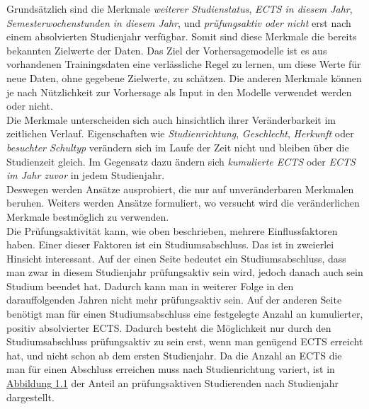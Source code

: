 Grunds\"atzlich sind die Merkmale \textit{\glqq weiterer Studienstatus\grqq{}},
\textit{\glqq ECTS in diesem Jahr\grqq{}}, \textit{\glqq Semesterwochenstunden in diesem Jahr\grqq{}}, und
\textit{\glqq pr\"ufungsaktiv oder nicht\grqq{}} erst nach einem absolvierten Studienjahr verf\"ugbar. Somit sind diese Merkmale
die bereits bekannten Zielwerte der Daten. Das Ziel der Vorhersagemodelle ist es aus vorhandenen Trainingsdaten eine verl\"assliche
Regel zu lernen, um diese Werte f\"ur neue Daten, ohne gegebene Zielwerte, zu
sch\"atzen. Die anderen Merkmale k\"onnen je nach N\"utzlichkeit zur Vorhersage als Input
in den Modelle verwendet werden oder nicht. \\

Die Merkmale unterscheiden sich auch hinsichtlich ihrer Ver\"anderbarkeit im zeitlichen Verlauf. Eigenschaften wie \textit{\glqq Studienrichtung\grqq{}},
\textit{\glqq Geschlecht\grqq{}}, \textit{\glqq Herkunft\grqq{}} oder \textit{\glqq besuchter Schultyp\grqq{}} ver\"andern sich im Laufe der Zeit nicht und bleiben \"uber die Studienzeit gleich.
Im Gegensatz dazu \"andern sich \textit{\glqq kumulierte ECTS\grqq{}} oder \textit{\glqq ECTS im Jahr zuvor\grqq{}} in jedem Studienjahr. \\

Deswegen werden Ans\"atze ausprobiert, die nur auf unver\"anderbaren Merkmalen beruhen. Weiters werden Ans\"atze formuliert, wo versucht wird
die ver\"anderlichen Merkmale bestm\"oglich zu verwenden. \\

Die Pr\"ufungsaktivit\"at kann, wie oben beschrieben, mehrere Einflussfaktoren haben. Einer dieser Faktoren ist ein Studiumsabschluss. Das ist in zweierlei Hinsicht interessant.
Auf der einen Seite bedeutet ein Studiumsabschluss, dass man zwar in diesem Studienjahr pr\"ufungsaktiv sein wird, jedoch danach auch sein Studium beendet hat.
Dadurch kann man in weiterer Folge in den darauffolgenden Jahren nicht mehr pr\"ufungsaktiv sein.
Auf der anderen Seite ben\"otigt man f\"ur einen Studiumsabschluss eine festgelegte Anzahl an kumulierter, positiv absolvierter ECTS. Dadurch besteht die
M\"oglichkeit nur durch den Studiumsabschluss pr\"ufungsaktiv zu sein erst, wenn man gen\"ugend ECTS erreicht hat, und nicht schon ab dem ersten Studienjahr.
Da die Anzahl an ECTS die man f\"ur einen Abschluss erreichen muss nach Studienrichtung variert, ist in \hyperref[fig:abb1]{Abbildung 1.1}
der Anteil an pr\"ufungsaktiven Studierenden nach Studienjahr dargestellt.

